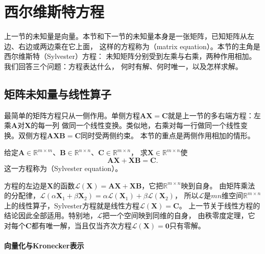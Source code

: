 
\section{西尔维斯特方程}
\label{sec:ls-matrix-equations}
\label{sec:linear-algebra-matrix-equations}

上一节的未知量是向量。本节和下一节的未知量本身是一张矩阵，已知矩阵从左边、右边或两边乘在它上面，
这样的方程称为（matrix equation）。本节的主角是西尔维斯特（Sylvester）方程：
未知矩阵分别受到左乘与右乘，两种作用相加。我们回答三个问题：方程表达什么，
何时有解、何时唯一，以及怎样求解。

\subsection{矩阵未知量与线性算子}
\label{sec:ls-matrix-equation-types}

最简单的矩阵方程只从一侧作用。单侧方程$\bm A\bm X=\bm C$就是上一节的多右端方程：左乘$\bm A$对$\bm X$的每一列
做同一个线性变换。类似地，右乘对每一行做同一个线性变换。双侧方程$\bm A\bm X\bm B=\bm C$同时受两侧约束。
本节的重点是两侧作用相加的情形。

\begin{definition}[Sylvester方程]
\label{def:matrix-analysis-sylvester-equation}
给定$\bm A\in\mathbb R^{m\times m}$、$\bm B\in\mathbb R^{n\times n}$、$\bm C\in\mathbb R^{m\times n}$，
求$\bm X\in\mathbb R^{m\times n}$使
\[
 \bm A\bm X+\bm X\bm B=\bm C .
\]
这一方程称为（Sylvester equation）。
\end{definition}

方程的左边是$\bm X$的函数$\mathcal L(\bm X)=\bm A\bm X+\bm X\bm B$，它把$\mathbb R^{m\times n}$映到自身。
由矩阵乘法的分配律，$\mathcal L(\alpha\bm X_1+\beta\bm X_2)=\alpha\mathcal L(\bm X_1)+\beta\mathcal L(\bm X_2)$，
所以$\mathcal L$是$mn$维空间$\mathbb R^{m\times n}$上的线性算子，Sylvester方程就是线性方程$\mathcal L(\bm X)=\bm C$。
上一节关于线性方程的结论因此全部适用。特别地，$\mathcal L$把一个空间映到同维的自身，
由秩零度定理，它对每个$\bm C$都有唯一解，当且仅当齐次方程$\mathcal L(\bm X)=\bm0$只有零解。

\paragraph{向量化与Kronecker表示}

